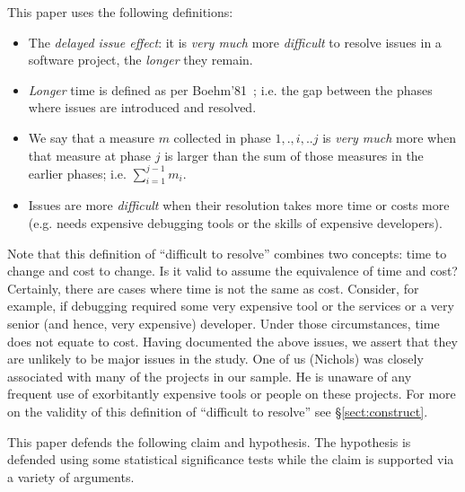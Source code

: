 \documentclass[smallcondensed]{svjour3}
\newcommand{\bi}{\begin{itemize}}%
\newcommand{\ei}{\end{itemize}}
\newcommand{\tion}[1]{\S\ref{sect:#1}}
\begin{document}
This paper uses the following definitions:
\bi
\item
The {\em delayed issue effect}:   it is {\em very much}  more {\em difficult} to resolve  issues in a software project, the {\em longer} they remain.
\item
 {\em Longer} time is defined as per  Boehm'81~\cite{Boehm81}; i.e. the gap between the   phases where   issues are introduced and resolved.
\item
We say that a measure $m$ collected in phase ${1,.,i,..j}$ is 
{\em very much} more when  that
   measure at phase $j$   
   is larger than the sum of those measures in the earlier phases;
   i.e. $\sum_{i=1}^{j-1} m_i $. 
\item
Issues are more {\em difficult}  
when their resolution takes more time or costs more  (e.g. needs expensive
debugging tools or the skills of expensive developers).
\ei


Note that this  definition of ``difficult to resolve''  combines two concepts: time to change and cost to change.  Is it valid to assume the equivalence of time and cost?
Certainly, there are cases where time is not the same as cost. Consider, for example, if debugging required some very expensive tool or the services or a very senior (and hence, very expensive) developer. Under those circumstances, time does not equate to cost.
Having documented the above issues, we assert that they are unlikely to be major issues in the study. One of us (Nichols) was closely associated with many of the projects in our sample. He is unaware of any frequent use of exorbitantly expensive tools or people on these projects. For more on the validity of this definition
of ``difficult to resolve'' see \tion{construct}.



This paper defends the following claim and hypothesis. The hypothesis is defended
using some statistical
significance tests while the claim is supported via a variety
of arguments.
\end{document}
